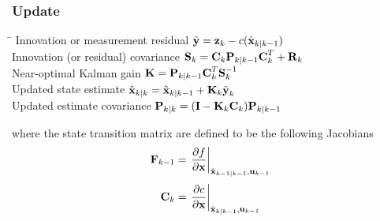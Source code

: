 \subsubsection*{Update}
\begin{tabbing}
\hspace{8cm}\=\kill
Innovation or measurement residual\> $\tilde{\textbf{y}}= \textbf{z}_k-c(\hat{\textbf{x}}_{k|k-1})$\\
Innovation (or residual) covariance\> $\textbf{S}_k=\textbf{C}_k\textbf{P}_{k|k-1}\textbf{C}^T_k+\textbf{R}_k$\\
Near-optimal Kalman gain\> $\textbf{K}=\textbf{P}_{k|k-1}\textbf{C}^T_k\textbf{S}^{-1}_k$\\
Updated state estimate\> $\hat{\textbf{x}}_{k|k}=\hat{\textbf{x}}_{k|k-1}+\textbf{K}_k\tilde{\textbf{y}}_k$\\
Updated estimate covariance\> $\textbf{P}_{k|k}=(\textbf{I}-\textbf{K}_k\textbf{C}_k)\textbf{P}_{k|k-1}$
\end{tabbing}
where the state transition matrix are defined to be the following Jacobians
\begin{equation*}
	\textbf{F}_{k-1}=\left. \frac{\partial f}{\partial \textbf{x}}\right|_{{\hat{\textbf{x}}_{k-1|k-1},			\textbf{u}_{k-1}}}
\end{equation*}
\begin{equation*}
	\textbf{C}_{k}=\left. \frac{\partial c}{\partial \textbf{x}}\right|_{{\hat{\textbf{x}}_{k|k-1},			\textbf{u}_{k-1}}}
\end{equation*}
